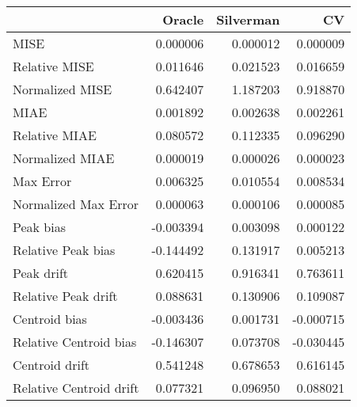\begin{tabular}{lrrr}
  \hline
 & Oracle & Silverman & CV \\ 
  \hline
MISE & 0.000006 & 0.000012 & 0.000009 \\ 
  Relative MISE & 0.011646 & 0.021523 & 0.016659 \\ 
  Normalized MISE & 0.642407 & 1.187203 & 0.918870 \\ 
  MIAE & 0.001892 & 0.002638 & 0.002261 \\ 
  Relative MIAE & 0.080572 & 0.112335 & 0.096290 \\ 
  Normalized MIAE & 0.000019 & 0.000026 & 0.000023 \\ 
  Max Error & 0.006325 & 0.010554 & 0.008534 \\ 
  Normalized Max Error & 0.000063 & 0.000106 & 0.000085 \\ 
  Peak bias & -0.003394 & 0.003098 & 0.000122 \\ 
  Relative Peak bias & -0.144492 & 0.131917 & 0.005213 \\ 
  Peak drift & 0.620415 & 0.916341 & 0.763611 \\ 
  Relative Peak drift & 0.088631 & 0.130906 & 0.109087 \\ 
  Centroid bias & -0.003436 & 0.001731 & -0.000715 \\ 
  Relative Centroid bias & -0.146307 & 0.073708 & -0.030445 \\ 
  Centroid drift & 0.541248 & 0.678653 & 0.616145 \\ 
  Relative Centroid drift & 0.077321 & 0.096950 & 0.088021 \\ 
   \hline
\end{tabular}
